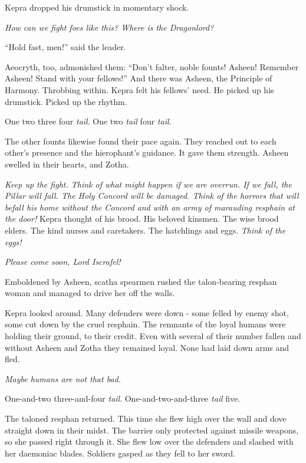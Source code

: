 \documentclass
  [a4paper,
   12pt,
   oneside
  ]%
  {article}
\begin{document}
Kepra dropped his drumstick in momentary shock. 

\emph{How can we fight foes like this? Where is the Dragonlord?}

``Hold fast, men!'' said the leader.

Aeocryth, too, admonished them: ``Don’t falter, noble founts! Asheen! Remember Asheen! Stand with your fellows!''
And there was Asheen, the Principle of Harmony. Throbbing within. Kepra felt his fellows’ need. He picked up his drumstick. Picked up the rhythm. 

One two three four \emph{tail}. One two \emph{tail} four \emph{tail}. 

The other founts likewise found their pace again. 
They reached out to each other’s presence and the hierophant’s guidance. It gave them strength. Asheen swelled in their hearts, and Zotha.

\emph{
    Keep up the fight. Think of what might happen if we are overrun. If we fall, the Pillar will fall. The Holy Concord will be damaged. 
    Think of the horrors that will befall his home without the Concord and with an army of marauding resphain at the door!%
} 
Kepra thought of his brood. His beloved kinsmen. The wise brood elders. The kind nurses and caretakers. The hatchlings and eggs. 
\emph{Think of the eggs!}

\emph{Please come soon, Lord Iscrafel!}

Emboldened by Asheen, scatha spearmen rushed the talon-bearing resphan woman and managed to drive her off the walls. 

Kepra looked around. Many defenders were down - some felled by enemy shot, some cut down by the cruel resphain. 
The remnants of the loyal humans were holding their ground, to their credit. 
Even with several of their number fallen and without Asheen and Zotha they remained loyal. None had laid down arms and fled. 

\emph{Maybe humans are not that bad.}

One-and-two three-and-four \emph{tail}. One-and-two-and-three \emph{tail} five. 

The taloned resphan returned. This time she flew high over the wall and dove straight down in their midst. 
The barrier only protected against missile weapons, so she passed right through it. 
She flew low over the defenders and slashed with her daemoniac blades. 
Soldiers gasped as they fell to her sword.
\end{document}
